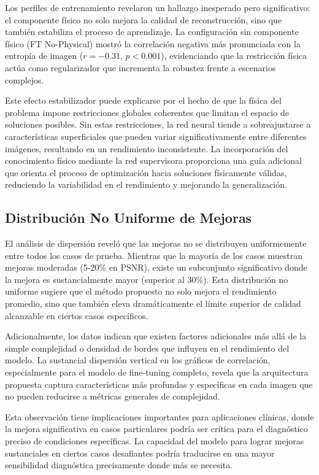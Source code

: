Los perfiles de entrenamiento revelaron un hallazgo inesperado pero significativo: el componente físico no solo mejora la calidad de reconstrucción, sino que también estabiliza el proceso de aprendizaje. La configuración sin componente físico (FT No-Physical) mostró la correlación negativa más pronunciada con la entropía de imagen ($r=-0.31$, $p<0.001$), evidenciando que la restricción física actúa como regularizador que incrementa la robustez frente a escenarios complejos.

Este efecto estabilizador puede explicarse por el hecho de que la física del problema impone restricciones globales coherentes que limitan el espacio de soluciones posibles. Sin estas restricciones, la red neural tiende a sobreajustarse a características superficiales que pueden variar significativamente entre diferentes imágenes, resultando en un rendimiento inconsistente. La incorporación del conocimiento físico mediante la red supervisora proporciona una guía adicional que orienta el proceso de optimización hacia soluciones físicamente válidas, reduciendo la variabilidad en el rendimiento y mejorando la generalización.

\subsection{Distribución No Uniforme de Mejoras}

El análisis de dispersión reveló que las mejoras no se distribuyen uniformemente entre todos los casos de prueba. Mientras que la mayoría de los casos muestran mejoras moderadas (5-20\% en PSNR), existe un subconjunto significativo donde la mejora es sustancialmente mayor (superior al 30\%). Esta distribución no uniforme sugiere que el método propuesto no solo mejora el rendimiento promedio, sino que también eleva dramáticamente el límite superior de calidad alcanzable en ciertos casos específicos.

Adicionalmente, los datos indican que existen factores adicionales más allá de la simple complejidad o densidad de bordes que influyen en el rendimiento del modelo. La sustancial dispersión vertical en los gráficos de correlación, especialmente para el modelo de fine-tuning completo, revela que la arquitectura propuesta captura características más profundas y específicas en cada imagen que no pueden reducirse a métricas generales de complejidad.

Esta observación tiene implicaciones importantes para aplicaciones clínicas, donde la mejora significativa en casos particulares podría ser crítica para el diagnóstico preciso de condiciones específicas. La capacidad del modelo para lograr mejoras sustanciales en ciertos casos desafiantes podría traducirse en una mayor sensibilidad diagnóstica precisamente donde más se necesita.

